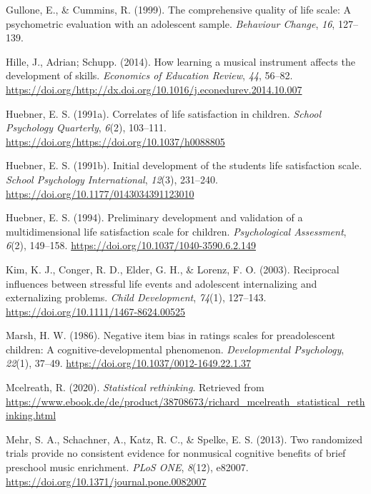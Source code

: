 \documentclass[a4, 12pt]{article}
\begin{document}
\leavevmode\hypertarget{ref-Gullone1999}{}%
Gullone, E., \& Cummins, R. (1999). The comprehensive quality of life scale: A psychometric evaluation with an adolescent sample. \emph{Behaviour Change}, \emph{16}, 127--139.

\leavevmode\hypertarget{ref-Hille2014}{}%
Hille, J., Adrian; Schupp. (2014). How learning a musical instrument affects the development of skills. \emph{Economics of Education Review}, \emph{44}, 56--82. \url{https://doi.org/http://dx.doi.org/10.1016/j.econedurev.2014.10.007}

\leavevmode\hypertarget{ref-Huebner1991}{}%
Huebner, E. S. (1991a). Correlates of life satisfaction in children. \emph{School Psychology Quarterly}, \emph{6}(2), 103--111. \url{https://doi.org/https://doi.org/10.1037/h0088805}

\leavevmode\hypertarget{ref-Huebner1991a}{}%
Huebner, E. S. (1991b). Initial development of the students life satisfaction scale. \emph{School Psychology International}, \emph{12}(3), 231--240. \url{https://doi.org/10.1177/0143034391123010}

\leavevmode\hypertarget{ref-Huebner1994}{}%
Huebner, E. S. (1994). Preliminary development and validation of a multidimensional life satisfaction scale for children. \emph{Psychological Assessment}, \emph{6}(2), 149--158. \url{https://doi.org/10.1037/1040-3590.6.2.149}

\leavevmode\hypertarget{ref-Kim2003}{}%
Kim, K. J., Conger, R. D., Elder, G. H., \& Lorenz, F. O. (2003). Reciprocal influences between stressful life events and adolescent internalizing and externalizing problems. \emph{Child Development}, \emph{74}(1), 127--143. \url{https://doi.org/10.1111/1467-8624.00525}

\leavevmode\hypertarget{ref-Marsh1986}{}%
Marsh, H. W. (1986). Negative item bias in ratings scales for preadolescent children: A cognitive-developmental phenomenon. \emph{Developmental Psychology}, \emph{22}(1), 37--49. \url{https://doi.org/10.1037/0012-1649.22.1.37}

\leavevmode\hypertarget{ref-Mcelreath2020}{}%
Mcelreath, R. (2020). \emph{Statistical rethinking}. Retrieved from \url{https://www.ebook.de/de/product/38708673/richard_mcelreath_statistical_rethinking.html}

\leavevmode\hypertarget{ref-Mehr2013}{}%
Mehr, S. A., Schachner, A., Katz, R. C., \& Spelke, E. S. (2013). Two randomized trials provide no consistent evidence for nonmusical cognitive benefits of brief preschool music enrichment. \emph{PLoS ONE}, \emph{8}(12), e82007. \url{https://doi.org/10.1371/journal.pone.0082007}
\end{document}
